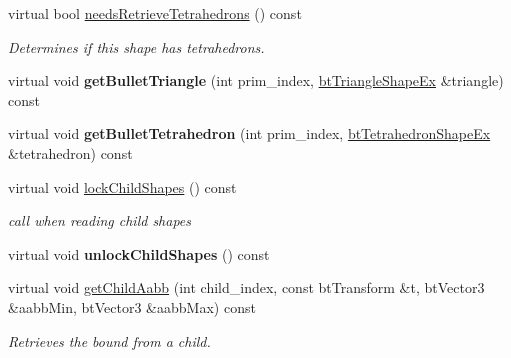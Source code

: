 \begin{DoxyCompactItemize}
\mbox{\label{classbtGImpactMeshShape_abe38ef4a56534abcd43dbe2e45e46157}} 
virtual bool \hyperlink{classbtGImpactMeshShape_abe38ef4a56534abcd43dbe2e45e46157}{needs\+Retrieve\+Tetrahedrons} () const
\begin{DoxyCompactList}\small\item\em Determines if this shape has tetrahedrons. \end{DoxyCompactList}\item 
\mbox{\label{classbtGImpactMeshShape_a938b4191a80e64b59568c68cd4afa14f}} 
virtual void {\bfseries get\+Bullet\+Triangle} (int prim\+\_\+index, \hyperlink{classbtTriangleShapeEx}{bt\+Triangle\+Shape\+Ex} \&triangle) const
\item 
\mbox{\label{classbtGImpactMeshShape_a22e730f292d812e680f6bf503231d8d4}} 
virtual void {\bfseries get\+Bullet\+Tetrahedron} (int prim\+\_\+index, \hyperlink{classbtTetrahedronShapeEx}{bt\+Tetrahedron\+Shape\+Ex} \&tetrahedron) const
\item 
\mbox{\label{classbtGImpactMeshShape_a89c9a1dba1b1ea3d74b4545fd5f92ae0}} 
virtual void \hyperlink{classbtGImpactMeshShape_a89c9a1dba1b1ea3d74b4545fd5f92ae0}{lock\+Child\+Shapes} () const
\begin{DoxyCompactList}\small\item\em call when reading child shapes \end{DoxyCompactList}\item 
\mbox{\label{classbtGImpactMeshShape_afd80219b051a71867198e4b15d6e1c1c}} 
virtual void {\bfseries unlock\+Child\+Shapes} () const
\item 
\mbox{\label{classbtGImpactMeshShape_a8b38c48b69c6eb790365b0593655975b}} 
virtual void \hyperlink{classbtGImpactMeshShape_a8b38c48b69c6eb790365b0593655975b}{get\+Child\+Aabb} (int child\+\_\+index, const bt\+Transform \&t, bt\+Vector3 \&aabb\+Min, bt\+Vector3 \&aabb\+Max) const
\begin{DoxyCompactList}\small\item\em Retrieves the bound from a child. \end{DoxyCompactList}\item 

\end{DoxyCompactItemize}

